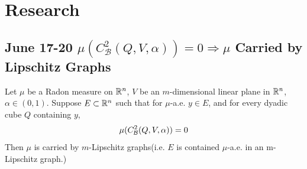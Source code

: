 \section{Research}


\subsection{June 17-20 \texorpdfstring{$\mu(C_\mathcal{B}^2(Q, V, \alpha)) = 0 \Rightarrow \mu$ Carried by Lipschitz Graphs}{Lg}}

\begin{lemma}\label{lemma:CBQ2carried}
    Let $\mu$ be a Radon measure on $\mathbb{R}^n$, $V$ be an $m$-dimensional linear plane in $\mathbb{R}^n$, $\alpha\in(0,1)$. Suppose $E\subset \mathbb{R}^n$ such that for $\mu$-a.e. $y\in E$, and for every dyadic cube $Q$ containing $y$, 
    \begin{equation}\label{muB2=0}
        \mu(C_\mathcal B^2(Q, V, \alpha)) = 0
    \end{equation}
    Then $\mu$ is carried by $m$-Lipschitz graphs(i.e. $E$ is contained $\mu$-a.e. in an m-Lipschitz graph.)
\end{lemma}

